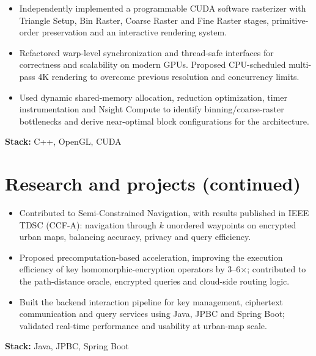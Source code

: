 \documentclass[11pt,a4paper]{article}
\begin{document}
\begin{itemize}
\item Independently implemented a programmable CUDA software rasterizer with Triangle Setup, Bin Raster, Coarse Raster and Fine Raster stages, primitive-order preservation and an interactive rendering system.
\item Refactored warp-level synchronization and thread-safe interfaces for correctness and scalability on modern GPUs. Proposed CPU-scheduled multi-pass 4K rendering to overcome previous resolution and concurrency limits.
\item Used dynamic shared-memory allocation, reduction optimization, timer instrumentation and Nsight Compute to identify binning/coarse-raster bottlenecks and derive near-optimal block configurations for the architecture.
\end{itemize}
\textbf{Stack:} C++, OpenGL, CUDA

\newpage
\section{Research and projects (continued)}
\begin{itemize}
\item Contributed to Semi-Constrained Navigation, with results published in IEEE TDSC (CCF-A): navigation through $k$ unordered waypoints on encrypted urban maps, balancing accuracy, privacy and query efficiency.
\item Proposed precomputation-based acceleration, improving the execution efficiency of key homomorphic-encryption operators by 3--6$\times$; contributed to the path-distance oracle, encrypted queries and cloud-side routing logic.
\item Built the backend interaction pipeline for key management, ciphertext communication and query services using Java, JPBC and Spring Boot; validated real-time performance and usability at urban-map scale.
\end{itemize}
\textbf{Stack:} Java, JPBC, Spring Boot
\end{document}
